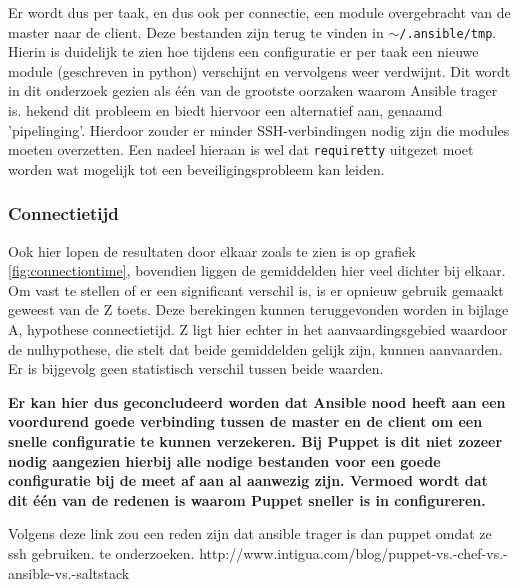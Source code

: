 Er wordt dus per taak, en dus ook per connectie, een module overgebracht van de master naar de client. Deze bestanden zijn terug te vinden in \texttt{$\sim$/.ansible/tmp}. Hierin is duidelijk te zien hoe tijdens een configuratie er per taak een nieuwe module (geschreven in python) verschijnt en vervolgens weer verdwijnt. Dit wordt in dit onderzoek gezien als \'e\'en van de grootste oorzaken waarom Ansible trager is.  \textcite{AnsibleTuning} hekend dit probleem en biedt hiervoor een alternatief aan, genaamd 'pipelinging'. Hierdoor zouder er minder SSH-verbindingen nodig zijn die modules moeten overzetten. Een nadeel hieraan is wel dat \texttt{requiretty} uitgezet moet worden wat mogelijk tot een beveiligingsprobleem kan leiden.

\subsubsection{Connectietijd}
Ook hier lopen de resultaten door elkaar zoals te zien is op grafiek \ref{fig:connectiontime}, bovendien liggen de gemiddelden hier veel dichter bij elkaar. Om vast te stellen of er een significant verschil is, is er opnieuw gebruik gemaakt geweest van de Z toets. Deze berekingen kunnen teruggevonden worden in bijlage A, hypothese connectietijd. Z ligt hier echter in het aanvaardingsgebied waardoor de nulhypothese, die stelt dat beide gemiddelden gelijk zijn, kunnen aanvaarden. Er is bijgevolg geen statistisch verschil tussen beide waarden.

\textbf{Er kan hier dus geconcludeerd worden dat Ansible nood heeft aan een voordurend goede verbinding tussen de master en de client om een snelle configuratie te kunnen verzekeren. Bij Puppet is dit niet zozeer nodig aangezien hierbij alle nodige bestanden voor een goede configuratie bij de meet af aan al aanwezig zijn. Vermoed wordt dat dit \'e\'en van de redenen is waarom Puppet sneller is in configureren.}

 {\color{red}Volgens deze link zou een reden zijn dat ansible trager is dan puppet omdat ze ssh gebruiken. te onderzoeken. http://www.intigua.com/blog/puppet-vs.-chef-vs.-ansible-vs.-saltstack}





